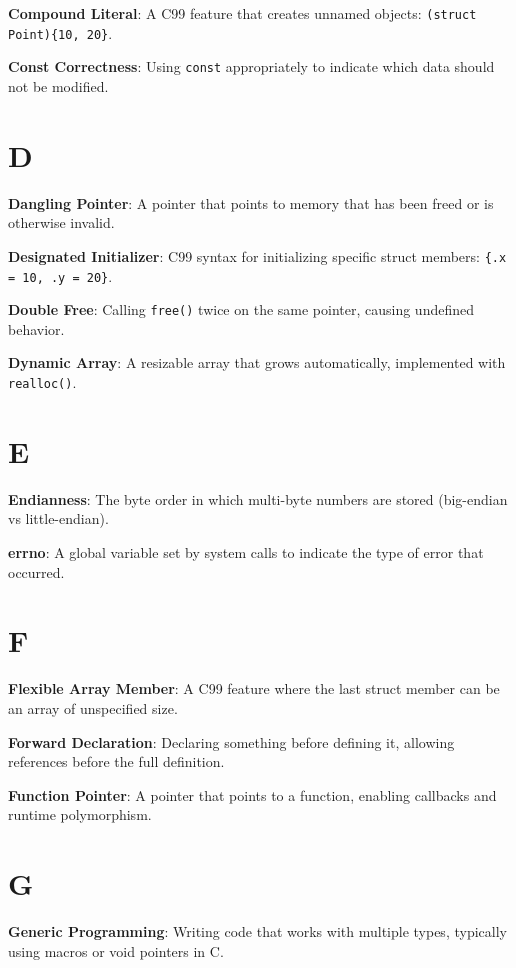 \documentclass[10pt,openany]{book}
\begin{document}
\textbf{Compound Literal}: A C99 feature that creates unnamed objects: \texttt{(struct Point)\{10, 20\}}.

\textbf{Const Correctness}: Using \texttt{const} appropriately to indicate which data should not be modified.

\section*{D}

\textbf{Dangling Pointer}: A pointer that points to memory that has been freed or is otherwise invalid.

\textbf{Designated Initializer}: C99 syntax for initializing specific struct members: \texttt{\{.x = 10, .y = 20\}}.

\textbf{Double Free}: Calling \texttt{free()} twice on the same pointer, causing undefined behavior.

\textbf{Dynamic Array}: A resizable array that grows automatically, implemented with \texttt{realloc()}.

\section*{E}

\textbf{Endianness}: The byte order in which multi-byte numbers are stored (big-endian vs little-endian).

\textbf{errno}: A global variable set by system calls to indicate the type of error that occurred.

\section*{F}

\textbf{Flexible Array Member}: A C99 feature where the last struct member can be an array of unspecified size.

\textbf{Forward Declaration}: Declaring something before defining it, allowing references before the full definition.

\textbf{Function Pointer}: A pointer that points to a function, enabling callbacks and runtime polymorphism.

\section*{G}

\textbf{Generic Programming}: Writing code that works with multiple types, typically using macros or void pointers in C.
\end{document}

